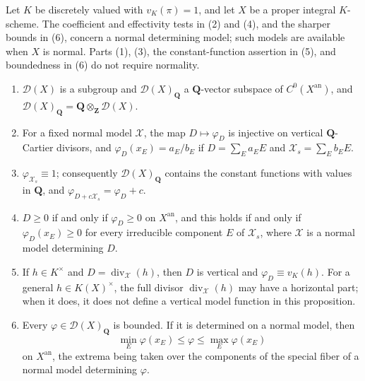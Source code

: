 \begin{proposition}
\label{prop:metrics-divisor-model-function}
Let $K$ be discretely valued with $v_K(\pi)=1$, and let $X$ be a
proper integral $K$-scheme. The coefficient and effectivity tests in
(2) and (4), and the sharper bounds in (6), concern a normal determining
model; such models are available when $X$ is normal. Parts (1), (3),
the constant-function assertion in (5), and boundedness in (6) do not
require normality.
\begin{enumerate}
\item $\mathcal D(X)$ is a subgroup and $\mathcal D(X)_{\mathbf Q}$ a
$\mathbf Q$-vector subspace of $C^0(X^{\mathrm{an}})$, and
$\mathcal D(X)_{\mathbf Q}=\mathbf Q\otimes_{\mathbf Z}\mathcal D(X)$.
\item For a fixed normal model $\mathcal X$, the map $D\mapsto\varphi_D$
is injective on vertical $\mathbf Q$-Cartier divisors, and
$\varphi_D(x_E)=a_E/b_E$ if $D=\sum_Ea_EE$ and
$\mathcal X_s=\sum_Eb_EE$.
\item $\varphi_{\mathcal X_s}\equiv1$; consequently
$\mathcal D(X)_{\mathbf Q}$ contains the constant functions with values in
$\mathbf Q$, and $\varphi_{D+c\mathcal X_s}=\varphi_D+c$.
\item $D\ge0$ if and only if $\varphi_D\ge0$ on $X^{\mathrm{an}}$, and
this holds if and only if $\varphi_D(x_E)\ge0$ for every irreducible
component $E$ of $\mathcal X_s$, where $\mathcal X$ is a normal model
determining $D$.
\item If $h\in K^\times$ and
$D=\operatorname{div}_{\mathcal X}(h)$, then $D$ is vertical and
$\varphi_D\equiv v_K(h)$.  For a general $h\in K(X)^\times$, the full
divisor $\operatorname{div}_{\mathcal X}(h)$ may have a horizontal part;
when it does, it does not define a vertical model function in this proposition.
\item Every $\varphi\in\mathcal D(X)_{\mathbf Q}$ is bounded. If it is
determined on a normal model, then
\[
 \min_E\varphi(x_E)\le\varphi\le\max_E\varphi(x_E)
\]
on $X^{\mathrm{an}}$, the extrema being taken over the components of the
special fiber of a normal model determining $\varphi$.
\end{enumerate}
\end{proposition}

